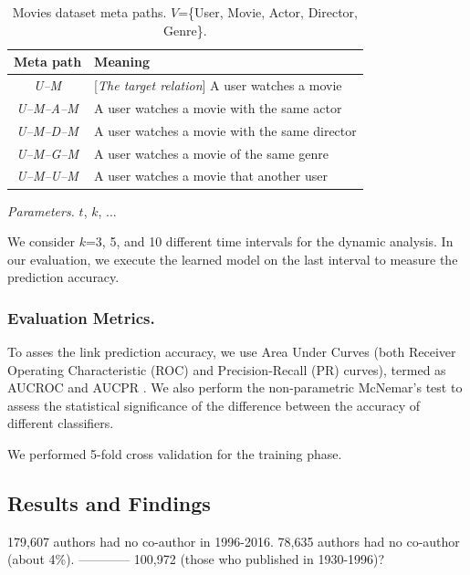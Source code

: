 \begin{table}[t]
\centering
\caption{Movies dataset meta paths. $V$=\{User, Movie, Actor, Director, Genre\}.}
\label{table_movies}\scriptsize
\begin{tabular}{|c|l|} \hline
\textbf{Meta path} & \textbf{Meaning} \\ \hline
\textit{U--M} & [\textit{The target relation}] A user watches a movie \\ \hline

\textit{U--M--A--M} & A user watches a movie with the same actor \\ \hline
\textit{U--M--D--M} & A user watches a movie with the same director \\ \hline
\textit{U--M--G--M} & A user watches a movie of the same genre \\ \hline
\textit{U--M--U--M} & A user watches a movie that another user  \\ \hline

\end{tabular}
\end{table}


\textit{Parameters.} $t$, $k$, ...

We consider $k$=3, 5, and 10 different time intervals for the dynamic analysis. In our evaluation, we execute the learned model on the last interval to measure the prediction accuracy.

\subsubsection{Evaluation Metrics.} 

To asses the link prediction accuracy, we use Area Under Curves (both Receiver Operating Characteristic (ROC) and Precision-Recall (PR) curves), termed as AUCROC and AUCPR \cite{davis2006relationship}. We also perform the non-parametric McNemar's test \cite{mcnemar1947note} to assess the statistical significance of the difference between the accuracy of different classifiers.

We performed 5-fold cross validation for the training phase.


\subsection{Results and Findings}

    179,607 authors had no co-author in 1996-2016. 
    78,635 authors had no co-author (about 4\%). 
    ------------
    100,972 (those who published in 1930-1996)?
    
